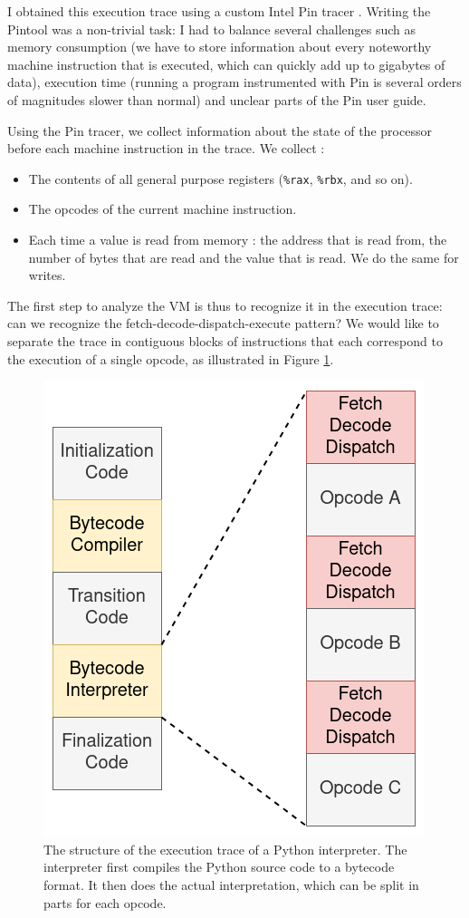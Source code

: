 \documentclass[english]{article}
\begin{document}
I obtained this execution trace using a custom Intel Pin tracer \cite{intelpin}. Writing the Pintool was a non-trivial task: I had to balance several challenges such as memory consumption (we have to store information about every noteworthy machine instruction that is executed, which can quickly add up to gigabytes of data), execution time (running a program instrumented with Pin is several orders of magnitudes slower than normal) and unclear parts of the Pin user guide.

Using the Pin tracer, we collect information about the state of the processor before each machine instruction in the trace. We collect : 
\begin{itemize}
	\item The contents of all general purpose registers (\texttt{\%rax}, \texttt{\%rbx}, and so on).
	\item The opcodes of the current machine instruction.
	\item Each time a value is read from memory : the address that is read from, the number of bytes that are read and the value that is read. We do the same for writes.
\end{itemize}

The first step to analyze the VM is thus to recognize it in the execution trace: can we recognize the fetch-decode-dispatch-execute pattern? We would like to separate the trace in contiguous blocks of instructions that each correspond to the execution of a single opcode, as illustrated in Figure \ref{fig:trace}.

\begin{figure}[htp]
	\centering 
	\includegraphics[width=.4\linewidth]{img/Trace.png}
	\caption{The structure of the execution trace of a Python interpreter. The interpreter first compiles the Python source code to a bytecode format. It then does the actual interpretation, which can be split in parts for each opcode.}
	\label{fig:trace}
\end{figure}
\end{document}
